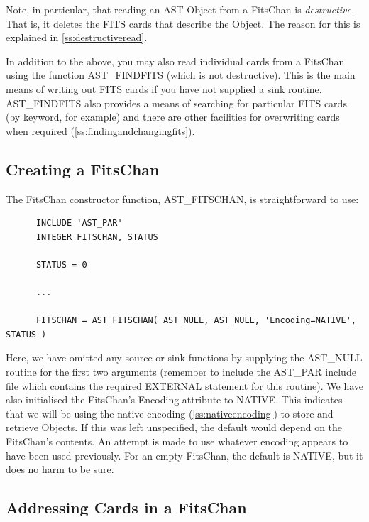 \documentclass[twoside,11pt]{article}
\newcommand{\htmlref}[2]{#1}
\newcommand{\secref}[1]{\S\ref{#1}}
\renewcommand{\secref}[1]{\ref{#1}}
\begin{document}
Note, in particular, that reading an AST Object from a FitsChan is
{\em{destructive.}} That is, it deletes the FITS cards that describe the
Object. The reason for this is explained in
\secref{ss:destructiveread}.

In addition to the above, you may also read individual cards from a
FitsChan using the function \htmlref{AST\_FINDFITS}{AST_FINDFITS} (which is not
destructive). This is the main means of writing out FITS cards if you
have not supplied a sink routine.  AST\_FINDFITS also provides a means
of searching for particular FITS cards (by keyword, for example) and
there are other facilities for overwriting cards when required
(\secref{ss:findingandchangingfits}).

\subsection{\label{ss:creatingafitschan}Creating a FitsChan}

The \htmlref{FitsChan}{FitsChan} constructor function, \htmlref{AST\_FITSCHAN}{AST_FITSCHAN}, is straightforward
to use:

\small
\begin{verbatim}
      INCLUDE 'AST_PAR'
      INTEGER FITSCHAN, STATUS

      STATUS = 0

      ...

      FITSCHAN = AST_FITSCHAN( AST_NULL, AST_NULL, 'Encoding=NATIVE', STATUS )
\end{verbatim}
\normalsize

Here, we have omitted any source or sink functions by supplying the
AST\_NULL routine for the first two arguments (remember to include the
AST\_PAR include file which contains the required EXTERNAL statement
for this routine).
We have also initialised the FitsChan's \htmlref{Encoding}{Encoding} attribute to
NATIVE. This indicates that we will be using the native encoding
(\secref{ss:nativeencoding}) to store and retrieve Objects. If this
was left unspecified, the default would depend on the FitsChan's
contents. An attempt is made to use whatever encoding appears to have
been used previously. For an empty FitsChan, the default is NATIVE,
but it does no harm to be sure.

\subsection{\label{ss:addressingfitscards}Addressing Cards in a FitsChan}
\end{document}
